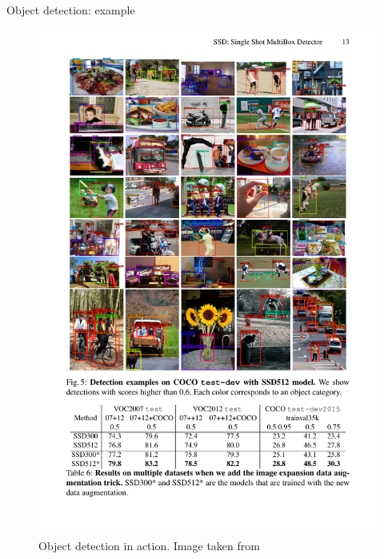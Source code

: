 \documentclass[xcolor=pdftex,dvipsnames,table]{beamer}
\begin{document}
\begin{frame}{Object detection: example}
\begin{figure}[htb]
   \centering
   \includegraphics[width=\textwidth]{../graphics/Detection_example3.pdf}
   \caption{Object detection in action. Image taken from \cite{Liu2016}}
\end{figure}
\end{frame}


\end{document}
